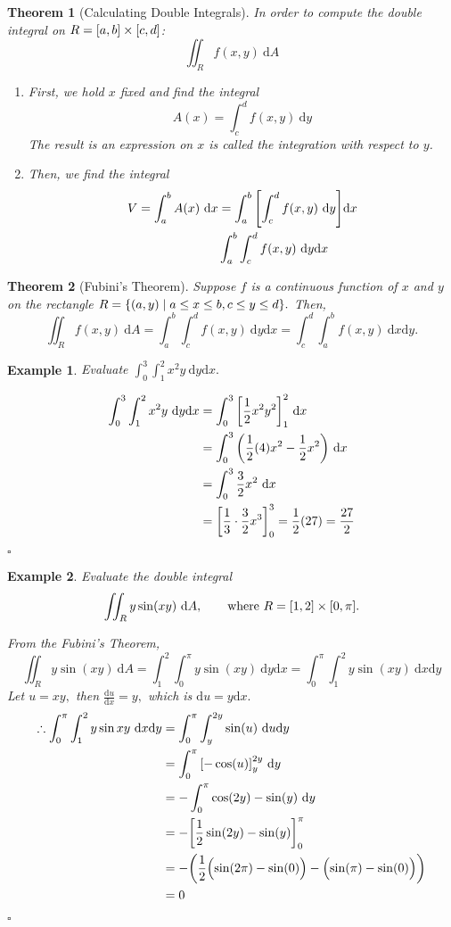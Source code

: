 \documentclass[12pt,a4paper]{article}
\newtheorem{thm}{Theorem}[subsection]
\newtheorem{eg}{Example}[subsection]
\newenvironment*{ans}{\par\indent{\textit{Answer. }}\par}{\par\hfill{$\square$}\par}
\def\d{{\mathrm{d}}}
\def\dx{\d x}
\def\iintR{\displaystyle\iint_R}
\begin{document}
\begin{thm}[Calculating Double Integrals]
	In order to compute the double integral on $R=\qty[a,b]\times\qty[c,d]$: \[\iintR f(x,y)\ \d A\]
	\begin{enumerate}
		\item First, we hold $x$ fixed and find the integral \[A(x)=\int_c^df(x,y)\ \d y\] The result is an expression on $x$ is called the integration with respect to $y$.
		\item Then, we find the integral \[\begin{aligned}V=\int_a^bA(x)\ \dx&=\int_a^b\qty[\int_c^df(x,y)\ \d y]\dx\\&\int_a^b\int_c^df(x,y)\ \d y\dx\end{aligned}\]
	\end{enumerate}
\end{thm}
\begin{thm}[Fubini's Theorem]
	Suppose $f$ is a continuous function of $x$ and $y$ on the rectangle $R=\qty{(a,y)\mid a\leq x\leq b, c\leq y\leq d}.$ Then, \[\iintR f(x,y)\ \d A=\int_a^b\int_c^df(x,y)\ \d y\dx=\int_c^d\int_a^bf(x,y)\ \dx\d y.\]
\end{thm}
\begin{eg} Evaluate $\displaystyle\int_0^3\int_1^2x^2y\ \d y\dx.$
\begin{ans}
	\[\begin{aligned}\int_0^3\int_1^2x^2y\ \d y\dx&=\int_0^3\qty[\dfrac{1}{2}x^2y^2]_1^2\ \dx\\&=\int_0^3\qty(\dfrac{1}{2}(4)x^2-\dfrac{1}{2}x^2)\ \dx\\&=\int_0^3\dfrac{3}{2}x^2\ \dx\\&=\qty[\dfrac{1}{3}\cdot\dfrac{3}{2}x^3]_0^3=\dfrac{1}{2}(27)=\dfrac{27}{2}\end{aligned}\]
\end{ans}	
\end{eg}
\begin{eg}
	Evaluate the double integral \[\iintR y\sin(xy)\ \d A,\qquad\text{where }R=\qty[1,2]\times\qty[0,\pi].\]
	\begin{ans}
		From the Fubini's Theorem, \[\iintR y\sin(xy)\ \d A=\int_1^2\int_0^\pi y\sin(xy)\ \d y\dx=\int_0^\pi\int_1^2 y\sin(xy)\ \dx\d y\] Let $u=xy,$ then $\displaystyle \frac{\d u}{\dx}=y,$ which is $\d u=y\dx.$ \[\begin{aligned}\therefore\int_0^\pi\int_1^2y\sin{xy}\ \dx\d y&=\int_0^\pi\int_y^{2y}\sin(u)\ \d u\d y\\&=\int_0^\pi\qty[-\cos(u)]^{2y}_y\ \d y\\&=-\int_0^\pi\cos(2y)-\sin(y)\ \d y\\&=-\qty[\frac{1}{2}\sin(2y)-\sin(y)]_0^\pi\\&=-\qty(\dfrac{1}{2}\qty\Big(\sin(2\pi)-\sin(0))-\qty\Big(\sin(\pi)-\sin(0)))\\&=0\end{aligned}\]
	\end{ans}
\end{eg}
\end{document}
